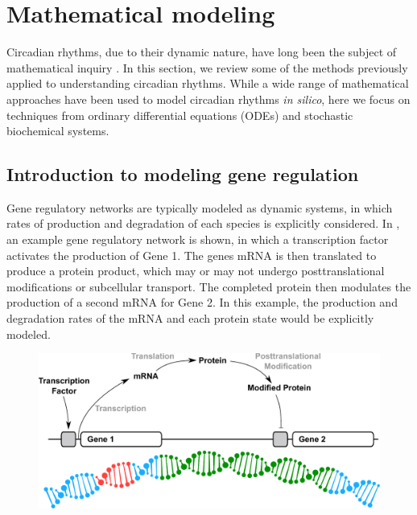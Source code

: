 
\section{Mathematical modeling}

Circadian rhythms, due to their dynamic nature, have long been the subject of mathematical inquiry \cite{Winfree2001}. In this section, we review some of the methods previously applied to understanding circadian rhythms.
While a wide range of mathematical approaches have been used to model circadian rhythms {\itshape in silico}, here we focus on techniques from ordinary differential equations (ODEs) and stochastic biochemical systems.

\subsection{Introduction to modeling gene regulation}

Gene regulatory networks are typically modeled as dynamic systems, in which rates of production and degradation of each species is explicitly considered.
In , an example gene regulatory network is shown, in which a transcription factor activates the production of Gene 1. 
The genes mRNA is then translated to produce a protein product, which may or may not undergo posttranslational modifications or subcellular transport. 
The completed protein then modulates the production of a second mRNA for Gene 2.
In this example, the production and degradation rates of the mRNA and each protein state would be explicitly modeled.

\begin{figure}[tbp]
  \centering
  \includegraphics[width=\textwidth, clip=True, trim=0 100 0 0]{chap1/figures/sysbio_intro.pdf}
  \label{fig:sysbiointro}
\end{figure}

